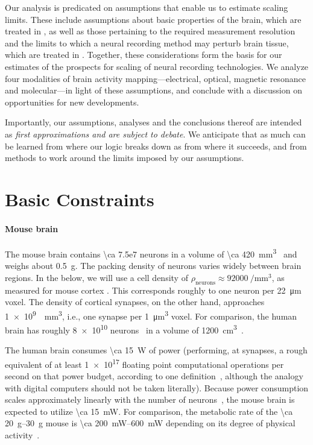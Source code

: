 Our analysis is predicated on assumptions that enable us to estimate scaling limits.
These include assumptions about basic properties of the brain, which are treated in , as well as those pertaining to the required measurement resolution and the limits to which a neural recording method may perturb brain tissue, which are treated in .
Together, these considerations form the basis for our estimates of the prospects for scaling of neural recording technologies.
We analyze four modalities of brain activity mapping---electrical, optical, magnetic resonance and molecular---in light of these assumptions, and conclude with a discussion on opportunities for new developments.

Importantly, our assumptions, analyses and the conclusions thereof are intended as \emph{first approximations and are subject to debate}.
We anticipate that as much can be learned from where our logic breaks down as from where it succeeds, and from methods to work around the limits imposed by our assumptions.

\section{Basic Constraints}
\label{sec:constraints}

\paragraph{Mouse brain}
The mouse brain contains \num{\ca 7.5e7} neurons in a volume of \SI{\ca 420}{\milli\meter\cubed}~\cite{vincent10} and weighs about \SI{0.5}{\gram}.
The packing density of neurons varies widely between brain regions. In the below, we will use a cell density of $\rho_{\text{neurons}} \approx \SI{92000}{\per\milli\meter\cubed}$, as measured for mouse cortex \cite{braitenberg1991anatomy}. This corresponds roughly to one neuron per \SI{22}{\micro\meter} voxel. The density of cortical synapses, on the other hand, approaches \SI{1e9}{\per\milli\meter\cubed}, i.e., one synapse per \SI{1}{\micro\meter\cubed} voxel. For comparison, the human brain has roughly \num{8e10} neurons~\cite{azevedo09} in a volume of \SI{1200}{\centi\meter\cubed}~\cite{allen02}.

The human brain consumes \SI{\ca 15}{\watt} of power (performing, at synapses, a rough equivalent of at least \num{1e17} floating point computational operations per second on that power budget, according to one definition~\cite{sarpeshkar10}, although the analogy with digital computers should not be taken literally).
Because power consumption scales approximately linearly with the number of neurons~\cite{houzel11}, the mouse brain is expected to utilize \SI{\ca 15}{\milli\watt}. For comparison, the metabolic rate of the \SIrange{\ca 20}{30}{\gram} mouse is \SIrange{\ca 200}{600}{\milli\watt} depending on its degree of physical activity~\cite{speakman13}.

